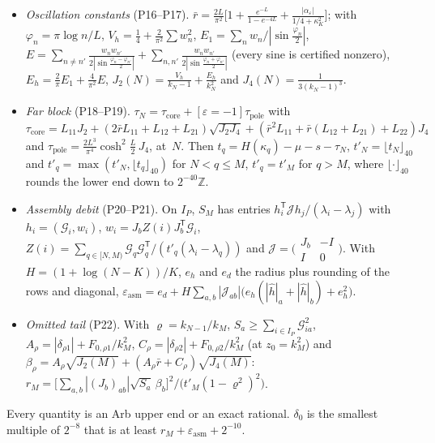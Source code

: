 \documentclass[11pt]{amsart}
\newcommand{\Tp}{\mathsf T}
\theoremstyle{definition}
\theoremstyle{remark}
\numberwithin{equation}{section}
\begin{document}
\begin{itemize}
\[\]
Then $L_{ab}:=\sum_{\rho,\sigma}(|\delta_{\rho a}|+F_{0,\rho a}/z_0)\,|(J_b)_{\rho\sigma}|\,F_{1,\sigma b}$ at $z_0=k_N^2$, where $\delta$ is the constant part of $\mathcal T$ (P15).
\item \emph{Oscillation constants} (P16--P17). $\bar r=\frac{2L}{\pi^2}\bigl[1+\frac{e^{-L}}{1-e^{-4L}}+\frac{|\alpha_\varepsilon|}{1/4+\kappa_K^2}\bigr]$; with $\varphi_n=\pi\log n/L$, $V_h=\frac14+\frac2{\pi^2}\sum w_n^2$, $E_1=\sum_nw_n/|\sin\frac{\varphi_n}2|$, $E=\sum_{n\ne n'}\frac{w_nw_{n'}}{2|\sin\frac{\varphi_n-\varphi_{n'}}2|}+\sum_{n,n'}\frac{w_nw_{n'}}{2|\sin\frac{\varphi_n+\varphi_{n'}}2|}$ (every sine is certified nonzero), $E_h=\frac2\pi E_1+\frac4{\pi^2}E$, $J_2(N)=\frac{V_h}{k_N-1}+\frac{E_h}{k_N^2}$ and $J_4(N)=\frac1{3(k_N-1)^3}$.
\item \emph{Far block} (P18--P19). $\tau_N=\tau_{\mathrm{core}}+[\varepsilon=-1]\tau_{\mathrm{pole}}$ with
$\tau_{\mathrm{core}}=L_{11}J_2+(2\bar rL_{11}+L_{12}+L_{21})\sqrt{J_2J_4}+(\bar r^2L_{11}+\bar r(L_{12}+L_{21})+L_{22})J_4$ and $\tau_{\mathrm{pole}}=\frac{2L^3}{\pi^4}\cosh^2\frac L2\,J_4$, at~$N$. Then $t_q=H(\kappa_q)-\mu-s-\tau_N$, $t'_N=\lfloor t_N\rfloor_{40}$ and $t'_q=\max(t'_N,\lfloor t_q\rfloor_{40})$ for $N<q\le M$, $t'_q=t'_M$ for $q>M$, where $\lfloor\cdot\rfloor_{40}$ rounds the lower end down to $2^{-40}\mathbb Z$.
\item \emph{Assembly debit} (P20--P21). On $I_P$, $S_M$ has entries $h_i^{\Tp}\mathcal Jh_j/(\lambda_i-\lambda_j)$ with $h_i=(\mathcal G_i,w_i)$, $w_i=J_bZ(i)J_b^{\Tp}\mathcal G_i$, $Z(i)=\sum_{q\in[N,M)}\mathcal G_q\mathcal G_q^{\Tp}/(t'_q(\lambda_i-\lambda_q))$ and $\mathcal J=\bigl(\begin{smallmatrix}J_b&-I\\I&0\end{smallmatrix}\bigr)$. With $H=(1+\log(N-K))/K$, $e_h$ and $e_d$ the radius plus rounding of the rows and diagonal, $\varepsilon_{\mathrm{asm}}=e_d+H\sum_{a,b}|\mathcal J_{ab}|\bigl(e_h(|\hat h|_a+|\hat h|_b)+e_h^2\bigr)$.
\item \emph{Omitted tail} (P22). With $\varrho=k_{N-1}/k_M$, $S_a\ge\sum_{i\in I_P}\mathcal G_{ia}^2$, $A_\rho=|\delta_{\rho1}|+F_{0,\rho1}/k_M^2$, $C_\rho=|\delta_{\rho2}|+F_{0,\rho2}/k_M^2$ (at $z_0=k_M^2$) and $\beta_\rho=A_\rho\sqrt{J_2(M)}+(A_\rho\bar r+C_\rho)\sqrt{J_4(M)}$: $r_M=\bigl[\sum_{a,b}|(J_b)_{ab}|\sqrt{S_a}\,\beta_b\bigr]^2/\bigl(t'_M(1-\varrho^2)^2\bigr)$.
\end{itemize}
Every quantity is an Arb upper end or an exact rational. $\delta_0$ is the smallest multiple of $2^{-8}$ that is at least $r_M+\varepsilon_{\mathrm{asm}}+2^{-10}$.
\end{document}
